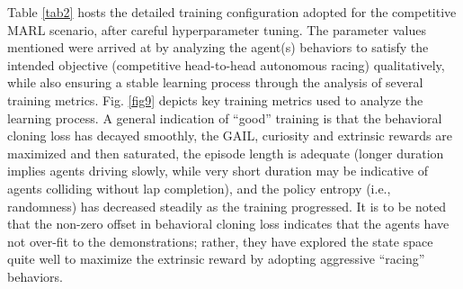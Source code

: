\documentclass[letterpaper, 10 pt, conference]{ieeeconf}  %
\begin{document}
	Table \ref{tab2} hosts the detailed training configuration adopted for the competitive MARL scenario, after careful hyperparameter tuning. The parameter values mentioned were arrived at by analyzing the agent(s) behaviors to satisfy the intended objective (competitive head-to-head autonomous racing) qualitatively, while also ensuring a stable learning process through the analysis of several training metrics. Fig. \ref{fig9} depicts key training metrics used to analyze the learning process. A general indication of ``good'' training is that the behavioral cloning loss has decayed smoothly, the GAIL, curiosity and extrinsic rewards are maximized and then saturated, the episode length is adequate (longer duration implies agents driving slowly, while very short duration may be indicative of agents colliding without lap completion), and the policy entropy (i.e., randomness) has decreased steadily as the training progressed. It is to be noted that the non-zero offset in behavioral cloning loss indicates that the agents have not over-fit to the demonstrations; rather, they have explored the state space quite well to maximize the extrinsic reward by adopting aggressive ``racing'' behaviors.
	
\end{document}
